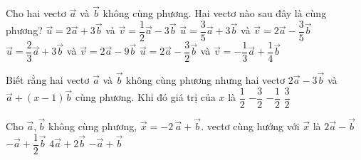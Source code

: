 \begin{ex}%
	Cho hai vectơ $\overrightarrow a $ và $\overrightarrow b $ không cùng phương. Hai vectơ nào sau đây là cùng phương?
	\choice
	{$\overrightarrow u=2\overrightarrow a+3\overrightarrow b $ và $\overrightarrow v=\dfrac{1}{2}\overrightarrow a-3\overrightarrow b $}
	{$\overrightarrow u=\dfrac{3}{5}\overrightarrow a+3\overrightarrow b $ và $\overrightarrow v=2\overrightarrow a-\dfrac{3}{5}\overrightarrow b $}
	{$\overrightarrow u=\dfrac{2}{3}\overrightarrow a+3\overrightarrow b $ và $\overrightarrow v=2\overrightarrow a-9\overrightarrow b $}
	{\True $\overrightarrow u=2\overrightarrow a-\dfrac{3}{2}\overrightarrow b $ và $\overrightarrow v=-\dfrac{1}{3}\overrightarrow a+\dfrac{1}{4}\overrightarrow b $}
\end{ex}

\begin{ex}%
	Biết rằng hai vectơ $\overrightarrow a $ và $\overrightarrow b $ không cùng phương nhưng hai vectơ $ 2\overrightarrow a-3\overrightarrow b $ và $\overrightarrow a+\left(x-1\right)\overrightarrow b $ cùng phương. Khi đó giá trị của $ x$ là 
	\choice
	{$\dfrac{1}{2}$}
	{$-\dfrac{3}{2}$}
	{\True $-\dfrac{1}{2}$}
	{$\dfrac{3}{2}$}
\end{ex}

\begin{ex}%
	Cho $\overrightarrow a, \overrightarrow b $ không cùng phương, $\overrightarrow{x }=-2\,\overrightarrow{a}+\overrightarrow{b}$. vectơ cùng hướng với $\overrightarrow{x}$ là 
	\choice
	{$2 \overrightarrow{a}-\overrightarrow{b}$}
	{\True $-\overrightarrow{a}+\dfrac{1}{2}\overrightarrow{b}$}
	{$4 \overrightarrow{a}+2\overrightarrow{b}$}
	{$- \overrightarrow{a}+\overrightarrow{b}$}
\end{ex}

